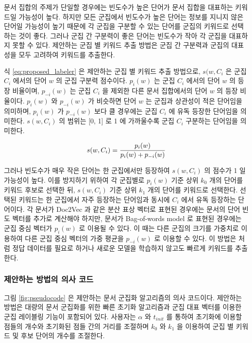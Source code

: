 \documentclass[11pt]{article}
\begin{document}
문서 집합의 주제가 단일할 경우에는 빈도수가 높은 단어가 문서 집합을 대표하는 키워드일 가능성이 높다.
하지만 모든 군집에서 빈도수가 높은 단어는 정보를 지니지 않은 단어일 가능성이 높기 때문에 각 군집을 구분할 수 있는 단어를 군집의 키워드로 선택하는 것이 좋다.
그러나 군집 간 구분력이 좋은 단어는 빈도수가 작아 각 군집을 대표하지 못할 수 있다.
제안하는 군집 별 키워드 추출 방법은 군집 간 구분력과 군집의 대표성을 모두 고려하여 키워드를 추출한다.

식 \ref{eq:proposed_labeler} 은 제안하는 군집 별 키워드 추출 방법으로, $s(w, C_i$ 은 군집 $C_i$ 에서의 단어 $w$ 의 군집 구분력 점수이다.
$p_i (w)$ 는 군집 $C_i$ 에서의 단어 $w$ 의 등장 비율이며, $p_{-i} (w)$ 는 군집 $C_i$ 을 제외한 다른 문서 집합에서의 단어 $w$ 의 등장 비율이다.
$p_i (w)$ 와 $p_{-i} (w)$ 가 비슷하면 단어 $w$ 는 군집과 상관성이 적은 단어임을 의미하며, $p_i (w)$ 가 $p_{-i} (w)$ 보다 클 경우에는 군집 $C_i$ 에 유독 등장한 단어임을 의미한다.
$s(w, C_i)$ 의 범위는 [0, 1] 로 1 에 가까울수록 군집 $C_i$ 구분하는 단어임을 의미한다.

\begin{equation}
\label{eq:proposed_labeler}
\centering
s(w, C_i) = \frac{p_i (w)}{p_i (w) + p_{-i}(w)}
\end{equation}

그러나 빈도수가 매우 작은 단어는 한 군집에서만 등장하여 $s(w, C_i)$ 의 점수가 1 일 가능성이 높다.
이를 방지하기 위하여 각 군집별로 $p_i (w)$ 기준 상위 $k_0$ 개의 단어를 키워드 후보로 선택한 뒤, $s(w, C_i)$ 기준 상위 $k_1$ 개의 단어를 키워드로 선택한다.
선택된 키워드는 한 군집에서 자주 등장하는 단어임과 동시에 $C_i$ 에서 유독 등장하는 단어이다.
각 문서가 Doc2Vec 과 같은 분산 표상 벡터로 표현된 경우에는 문서의 단어 빈도 벡터를 추가로 계산해야 하지만, 문서가 Bag-of-words model 로 표현된 경우에는 군집 중심 벡터가 $p_i (w)$ 로 이용될 수 있다.
이 때는 다른 군집의 크기를 가중치로 이용하여 다른 군집 중심 벡터의 가중 평균을 $p_{-i}(w)$ 로 이용할 수 있다.
이 방법은 \citep{zhang2006keyword, onan2016ensemble} 처럼 정답 데이터를 필요로 하거나 새로운 모델을 학습하지 않고도 빠르게 키워드를 추출한다.


\subsubsection{제안하는 방법의 의사 코드}

그림 \ref{fig:pseudocode} 은 제안하는 문서 군집화 알고리즘의 의사 코드이다.
제안하는 방법은 대량의 문서 군집화를 위한 빠른 초기화 알고리즘과 군집 대표 벡터를 이용한 군집 레이블링 기능이 포함되어 있다.
사용자는 $\alpha$ 와 $t_{init}$ 를 통하여 초기화에 이용할 점들의 개수와 초기화된 점들 간의 거리를 조절하며 $k_0$ 와 $k_1$ 을 이용하여 군집 별 키워드 및 후보 단어의 개수를 조절한다.
\end{document}
